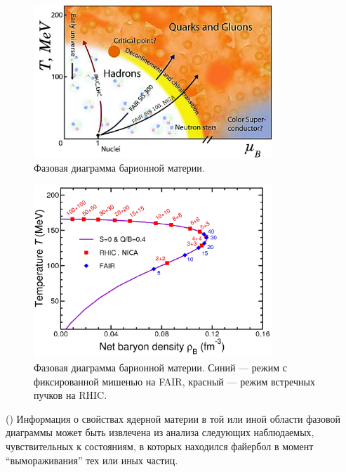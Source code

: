 \begin{figure}[H]
\includegraphics[width=0.8\textwidth]{pictures/qcdPhaseDiagram2.png}
\caption{Фазовая диаграмма барионной материи.}
\label{fig:PhaseDiagram}
\end{figure}

\begin{figure}[H]
\includegraphics[width=0.8\textwidth]{pictures/Phase_diag.png}
\caption{Фазовая диаграмма барионной материи. Синий --- режим с фиксированной мишенью на FAIR, красный --- режим встречных пучков на RHIC.}
\label{fig:PhaseDiagram2}
\end{figure}

()
Информация о свойствах ядерной материи в той или иной области фазовой диаграммы может быть извлечена из анализа следующих наблюдаемых, чувствительных к состояниям, в которых находился файербол в момент ``вымораживания'' тех или иных частиц.

